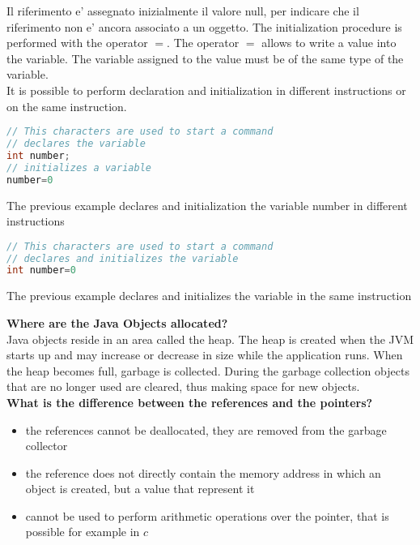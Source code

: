 \documentclass{article}
\begin{document}
Il riferimento e' assegnato inizialmente il valore null, per indicare che il riferimento non e' ancora associato a un oggetto.
The initialization procedure is performed with the operator $=$. The operator $=$ allows to write a value into the variable. The variable assigned to the value must be of the same type of the variable.\\
It is possible to perform declaration and initialization in different instructions or on the same instruction.
\begin{lstlisting}[language=Java,escapechar=|]
// This characters are used to start a command
// declares the variable
int number;
// initializes a variable
number=0
\end{lstlisting}
The previous example declares and initialization the  variable number in different instructions

\begin{lstlisting}[language=Java,escapechar=|]
// This characters are used to start a command
// declares and initializes the variable
int number=0
\end{lstlisting}
The previous example declares and initializes the variable in the same instruction



\textbf{Where are the Java Objects allocated?}\\
Java objects reside in an area called the heap. The heap is created when the JVM starts up and may increase or decrease in size while the application runs. When the heap becomes full, garbage is collected. During the garbage collection objects that are no longer used are cleared, thus making space for new objects.\\

\textbf{What is the difference between the references and the pointers?}
\begin{itemize}
\item the references cannot be deallocated, they are removed from the garbage collector
\item the reference does not directly contain the memory address in which an object is created, but a value that represent it
\item cannot be used to perform arithmetic operations over the pointer, that is possible for example in $c$
\end{itemize}
\end{document}
